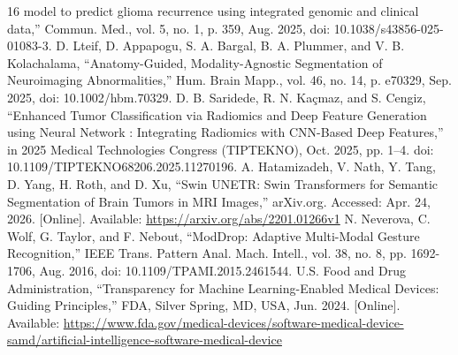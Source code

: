 \documentclass[letterpaper, 10pt, conference]{IEEEtran}
\begin{document}
\begin{thebibliography}{16}
model to predict glioma recurrence using integrated genomic and clinical data,'' Commun. Med., vol. 5, no.
1, p. 359, Aug. 2025, doi: 10.1038/s43856-025-01083-3.
 D. Lteif, D. Appapogu, S. A. Bargal, B. A. Plummer, and V. B. Kolachalama, ``Anatomy-Guided,
Modality-Agnostic Segmentation of Neuroimaging Abnormalities,'' Hum. Brain Mapp., vol. 46, no. 14, p.
e70329, Sep. 2025, doi: 10.1002/hbm.70329.
 D. B. Saridede, R. N. Ka\c{c}maz, and S. Cengiz, ``Enhanced Tumor Classification via Radiomics and Deep
Feature Generation using Neural Network : Integrating Radiomics with CNN-Based Deep Features,'' in 2025
Medical Technologies Congress (TIPTEKNO), Oct. 2025, pp. 1--4. doi: 10.1109/TIPTEKNO68206.2025.11270196.
 A. Hatamizadeh, V. Nath, Y. Tang, D. Yang, H. Roth, and D. Xu, ``Swin UNETR: Swin Transformers for
Semantic Segmentation of Brain Tumors in MRI Images,'' arXiv.org. Accessed: Apr. 24, 2026. [Online]. Available:
\url{https://arxiv.org/abs/2201.01266v1}
 N. Neverova, C. Wolf, G. Taylor, and F. Nebout, ``ModDrop: Adaptive Multi-Modal Gesture Recognition,''
IEEE Trans. Pattern Anal. Mach. Intell., vol. 38, no. 8, pp. 1692-1706, Aug. 2016, doi:
10.1109/TPAMI.2015.2461544.
 U.S. Food and Drug Administration, ``Transparency for Machine Learning-Enabled Medical Devices: Guiding
Principles,'' FDA, Silver Spring, MD, USA, Jun. 2024. [Online]. Available:
\url{https://www.fda.gov/medical-devices/software-medical-device-samd/artificial-intelligence-software-medical-device}
\end{thebibliography}
\end{document}
